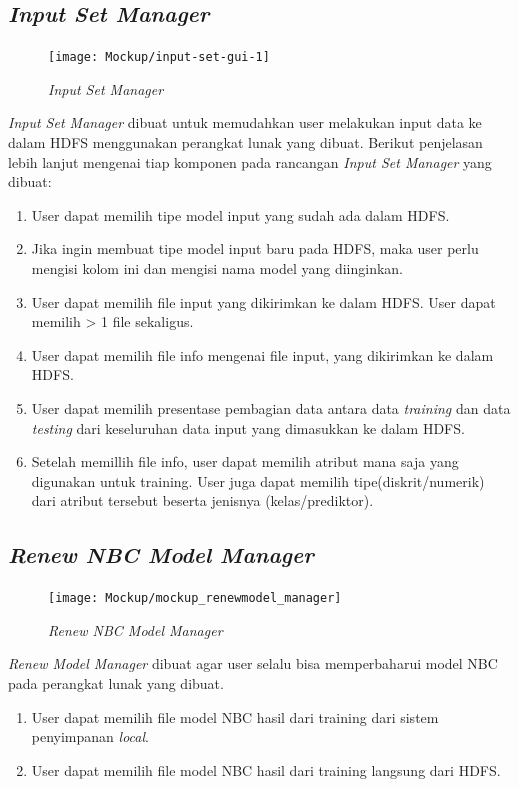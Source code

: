 \subsection{\textit{Input Set Manager}}
\label{subsec:Input Set Manager}

\begin{figure}[H]
	\centering
	\texttt{[image: Mockup/input-set-gui-1]}
	\caption[\textit{Input Set Manager}]{\textit{Input Set Manager}}
	\label{fig:Input Set Manager}
\end{figure}
\textit{Input Set Manager} dibuat untuk memudahkan user melakukan input data ke dalam HDFS menggunakan perangkat lunak yang dibuat. Berikut penjelasan lebih lanjut mengenai tiap komponen pada rancangan \textit{Input Set Manager} yang dibuat:
\begin{enumerate}
	\item User dapat memilih tipe model input yang sudah ada dalam HDFS.
	\item Jika ingin membuat tipe model input baru pada HDFS, maka user perlu mengisi kolom ini dan mengisi nama model yang diinginkan.
	\item User dapat memilih file input yang dikirimkan ke dalam HDFS. User dapat memilih > 1 file sekaligus.
	\item User dapat memilih file info mengenai file input, yang dikirimkan ke dalam HDFS.
	\item User dapat memilih presentase pembagian data antara data \textit{training} dan data \textit{testing} dari keseluruhan data input yang dimasukkan ke dalam HDFS.
	\item Setelah memillih file info, user dapat memilih atribut mana saja yang digunakan untuk training. User juga dapat memilih tipe(diskrit/numerik) dari atribut tersebut beserta jenisnya (kelas/prediktor).
\end{enumerate}

\subsection{\textit{Renew NBC Model Manager}}
\label{subsec:Renew Model Manager}

\begin{figure}[H]
	\centering
	\texttt{[image: Mockup/mockup\_renewmodel\_manager]}
	\caption[\textit{Renew NBC Model Manager}]{\textit{Renew NBC Model Manager}}
	\label{fig:Renew Model Manager}
\end{figure}
\textit{Renew Model Manager} dibuat agar user selalu bisa memperbaharui model NBC pada perangkat lunak yang dibuat.
\begin{enumerate}
	\item User dapat memilih file model NBC hasil dari training dari sistem penyimpanan \textit{local}.
	\item User dapat memilih file model NBC hasil dari training langsung dari HDFS.
\end{enumerate}

